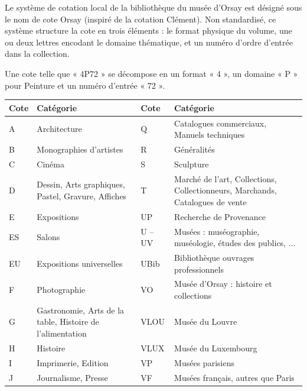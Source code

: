 Le système de cotation local de la bibliothèque du musée d'Orsay est désigné sous le nom de cote Orsay (inspiré de la cotation Clément). Non standardisé, ce système structure la cote en trois éléments : le format physique du volume, une ou deux lettres encodant le domaine thématique, et un numéro d'ordre d'entrée dans la collection.

Une cote telle que « 4P72 » se décompose en un format « 4 », un domaine « P » pour Peinture et un numéro d'entrée « 72 ».

\begin{table}[htbp]
\centering
\small
\setlength{\tabcolsep}{4pt}
\renewcommand{\arraystretch}{0.9}
\begin{tabular}{@{}p{}p{}p{}p{}@{}}
\toprule
\textbf{Cote} & \textbf{Catégorie} & \textbf{Cote} & \textbf{Catégorie} \\
\midrule
A      & Architecture                                   & Q       & Catalogues commerciaux, Manuels techniques \\
B      & Monographies d'artistes                        & R       & Généralités \\
C      & Cinéma                                         & S       & Sculpture \\
D      & Dessin, Arts graphiques, Pastel, Gravure, Affiches & T   & Marché de l'art, Collections, Collectionneurs, Marchands, Catalogues de vente \\
E      & Expositions                                    & UP      & Recherche de Provenance \\
ES     & Salons                                         & U -- UV & Musées : muséographie, muséologie, études des publics, ... \\
EU     & Expositions universelles                       & UBib    & Bibliothèque ouvrages professionnels \\
F      & Photographie                                   & VO      & Musée d'Orsay : histoire et collections \\
G      & Gastronomie, Arts de la table, Histoire de l'alimentation & VLOU & Musée du Louvre \\
H      & Histoire                                       & VLUX    & Musée du Luxembourg \\
I      & Imprimerie, Edition                            & VP      & Musées parisiens \\
J      & Journalisme, Presse                            & VF      & Musées français, autres que Paris \\

\end{tabular}
\end{table}
